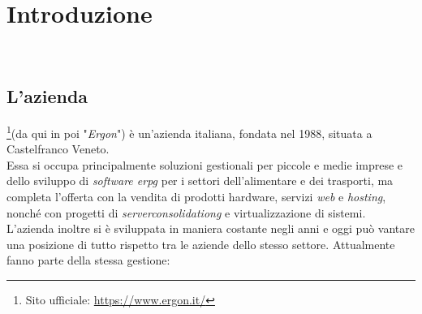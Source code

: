
\chapter{Introduzione}
\label{cap:introduzione}

\\





\section{L'azienda}

\noindent{\myCompany}\footnote{Sito ufficiale: \url{https://www.ergon.it/}}(da qui in poi "\textit{Ergon}") è un'azienda italiana, fondata nel 1988, 
situata a Castelfranco Veneto.\\
Essa si occupa principalmente soluzioni gestionali per piccole e medie imprese e dello sviluppo di \textit{software \gls{erpg}} per i settori dell'alimentare e dei trasporti,
ma completa l'offerta con la vendita di prodotti hardware, servizi \textit{web} e \textit{hosting}, nonché con progetti di \textit{\gls{serverconsolidationg}} e virtualizzazione di
sistemi.
L'azienda inoltre si è sviluppata in maniera costante negli anni e oggi può vantare una posizione di tutto rispetto tra le aziende dello stesso settore.
Attualmente fanno parte della stessa gestione:

